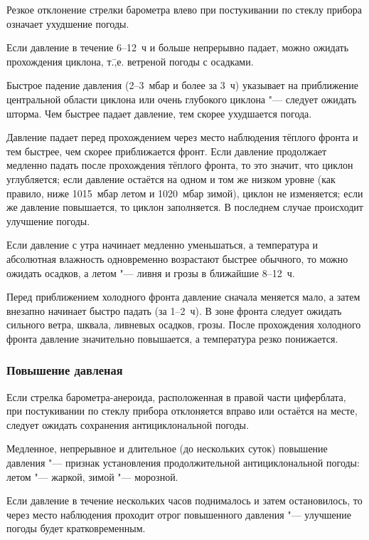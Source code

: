  Резкое отклонение стрелки барометра влево при постукивании по
стеклу прибора означает ухудшение погоды.

 Если давление в течение 6--12~ч и больше непрерывно падает, можно
ожидать прохождения циклона, т.\=,е. ветреной погоды с осадками.

 Быстрое падение давления (2--3~мбар и более за 3~ч)
указывает на приближение центральной области циклона или очень
глубокого циклона "--- следует ожидать шторма. Чем быстрее падает
давление, тем скорее ухудшается погода.

 Давление падает перед прохождением через место наблюдения
тёплого фронта и тем быстрее, чем скорее приближается фронт. Если
давление продолжает медленно падать после прохождения тёплого фронта,
то это значит, что циклон углубляется; если давление остаётся на одном
и том же низком уровне (как правило, ниже 1015~мбар летом и 1020~мбар
зимой), циклон не изменяется; если же давление повышается, то циклон
заполняется. В последнем случае происходит улучшение погоды.

 Если давление с утра начинает медленно уменьшаться, а
температура и абсолютная влажность одновременно возрастают быстрее
обычного, то можно ожидать осадков, а летом "--- ливня и грозы в
ближайшие 8--12~ч.

 Перед приближением холодного фронта давление сначала меняется
мало, а затем внезапно начинает быстро падать (за 1--2~ч). В зоне
фронта следует ожидать сильного ветра, шквала, ливневых осадков,
грозы. После прохождения холодного фронта давление значительно
повышается, а температура резко понижается.

\subsubsection{Повышение давленая}

 Если стрелка барометра-анероида, расположенная в правой части
циферблата, при постукивании по стеклу прибора отклоняется вправо или
остаётся на месте, следует ожидать сохранения антициклональной погоды.

 Медленное, непрерывное и длительное (до нескольких суток)
повышение давления "--- признак установления продолжительной
антициклональной погоды: летом "--- жаркой, зимой "--- морозной.

 Если давление в течение нескольких часов поднималось и затем
остановилось, то через место наблюдения проходит отрог повышенного
давления "--- улучшение погоды будет кратковременным.

